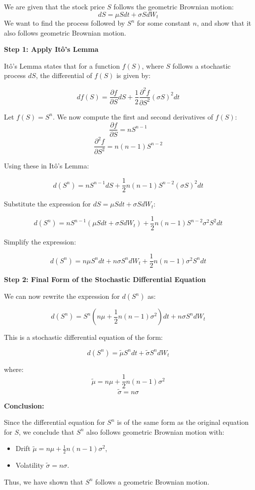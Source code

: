 \documentclass[12pt,letterpaper,onecolumn]{exam}
\begin{document}
\begin{solution}

We are given that the stock price \( S \) follows the geometric Brownian motion:
\[
dS = \mu S dt + \sigma S dW_t
\]
We want to find the process followed by \( S^n \) for some constant \( n \), and show that it also follows geometric Brownian motion.

\textbf{Step 1: Apply Itô’s Lemma}

Itô's Lemma states that for a function \( f(S) \), where \( S \) follows a stochastic process \( dS \), the differential of \( f(S) \) is given by:

\[
df(S) = \frac{\partial f}{\partial S} dS + \frac{1}{2} \frac{\partial^2 f}{\partial S^2} (\sigma S)^2 dt
\]

Let \( f(S) = S^n \). We now compute the first and second derivatives of \( f(S) \):
\[
\frac{\partial f}{\partial S} = nS^{n-1}
\]
\[
\frac{\partial^2 f}{\partial S^2} = n(n-1)S^{n-2}
\]

Using these in Itô's Lemma:

\[
d(S^n) = nS^{n-1} dS + \frac{1}{2} n(n-1) S^{n-2} (\sigma S)^2 dt
\]

Substitute the expression for \( dS = \mu S dt + \sigma S dW_t \):

\[
d(S^n) = nS^{n-1} (\mu S dt + \sigma S dW_t) + \frac{1}{2} n(n-1) S^{n-2} \sigma^2 S^2 dt
\]

Simplify the expression:

\[
d(S^n) = n\mu S^n dt + n\sigma S^n dW_t + \frac{1}{2} n(n-1) \sigma^2 S^n dt
\]

\textbf{Step 2: Final Form of the Stochastic Differential Equation}

We can now rewrite the expression for \( d(S^n) \) as:

\[
d(S^n) = S^n \left( n\mu + \frac{1}{2} n(n-1) \sigma^2 \right) dt + n\sigma S^n dW_t
\]

This is a stochastic differential equation of the form:

\[
d(S^n) = \tilde{\mu} S^n dt + \tilde{\sigma} S^n dW_t
\]

where:
\[
\tilde{\mu} = n\mu + \frac{1}{2}n(n-1)\sigma^2
\]
\[
\tilde{\sigma} = n\sigma
\]

\textbf{Conclusion:} 

Since the differential equation for \( S^n \) is of the same form as the original equation for \( S \), we conclude that \( S^n \) also follows geometric Brownian motion with:
\begin{itemize}
    \item Drift \( \tilde{\mu} = n\mu + \frac{1}{2}n(n-1)\sigma^2 \),
    \item Volatility \( \tilde{\sigma} = n\sigma \).
\end{itemize}

Thus, we have shown that \( S^n \) follows a geometric Brownian motion.

\end{solution}
\end{document}
